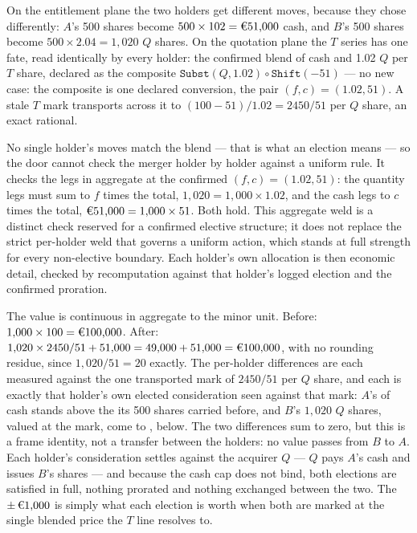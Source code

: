 On the entitlement plane the two holders get different moves, because they chose
differently: $A$'s 500 shares become $500 \times 102 = \EUR{51{,}000}$ cash, and $B$'s
500 shares become $500 \times 2.04 = 1{,}020$ $Q$ shares. On the quotation plane the
$T$ series has one fate, read identically by every holder: the confirmed blend of
 cash and 1.02 $Q$ per $T$ share, declared as the composite
$\texttt{Subst}(Q, 1.02) \circ \texttt{Shift}(-51)$ --- no new case: the composite is
one declared conversion, the pair $(f, c) = (1.02, 51)$. A stale  $T$ mark transports across it to
$(100 - 51)/1.02 = 2450/51$ per $Q$ share, an exact rational.

No single holder's moves match the blend --- that is what an election means --- so the
door cannot check the merger holder by holder against a uniform rule. It checks the
legs in aggregate at the confirmed $(f, c) = (1.02, 51)$: the quantity legs must sum
to $f$ times the total, $1{,}020 = 1{,}000 \times 1.02$, and the cash legs to $c$ times
the total, $\EUR{51{,}000} = 1{,}000 \times 51$. Both hold. This aggregate weld is a
distinct check reserved for a confirmed elective structure; it does not replace the
strict per-holder weld that governs a uniform action, which stands at full strength for
every non-elective boundary. Each holder's own allocation is then economic detail,
checked by recomputation against that holder's logged election and the confirmed
proration.

The value is continuous in aggregate to the minor unit. Before: $1{,}000 \times 100 =
\EUR{100{,}000}$. After: $1{,}020 \times 2450/51 + 51{,}000 = 49{,}000 + 51{,}000 =
\EUR{100{,}000}$, with no rounding residue, since $1{,}020/51 = 20$ exactly. The
per-holder differences are each measured against the one transported mark of $2450/51$
per $Q$ share, and each is exactly that holder's own elected consideration seen against
that mark: $A$'s  of cash stands  above the 
its 500 shares carried before, and $B$'s $1{,}020$ $Q$ shares, valued at the mark, come
to ,  below. The two differences sum to zero, but this is a
frame identity, not a transfer between the holders: no value passes from $B$ to $A$.
Each holder's consideration settles against the acquirer $Q$ --- $Q$ pays $A$'s cash and
issues $B$'s shares --- and because the cash cap does not bind, both elections are
satisfied in full, nothing prorated and nothing exchanged between the two. The
$\pm\,\EUR{1{,}000}$ is simply what each election is worth when both are marked at the
single blended price the $T$ line resolves to.

